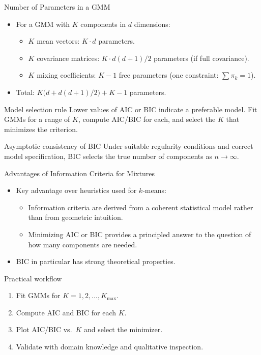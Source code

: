 \begin{frame}{Number of Parameters in a GMM}
  \begin{itemize}
    \item For a GMM with $K$ components in $d$ dimensions:
      \begin{itemize}
        \item $K$ mean vectors: $K \cdot d$ parameters.
        \item $K$ covariance matrices: $K \cdot d(d+1)/2$ parameters (if full covariance).
        \item $K$ mixing coefficients: $K-1$ free parameters (one constraint: $\sum\pi_k=1$).
      \end{itemize}
    \item Total: $K\big(d+d(d+1)/2\big)+K-1$ parameters.
  \end{itemize}
  \begin{block}{Model selection rule}
    Lower values of AIC or BIC indicate a preferable model. Fit GMMs for a range of $K$,
    compute AIC/BIC for each, and select the $K$ that minimizes the criterion.
  \end{block}
  \begin{alertblock}{Asymptotic consistency of BIC}
    Under suitable regularity conditions and correct model specification, BIC selects the
    true number of components as $n\to\infty$.
  \end{alertblock}
\end{frame}

\begin{frame}{Advantages of Information Criteria for Mixtures}
  \begin{itemize}
    \item Key advantage over heuristics used for $k$-means:
      \begin{itemize}
        \item Information criteria are \alert{derived} from a coherent statistical model
              rather than from geometric intuition.
        \item Minimizing AIC or BIC provides a principled answer to the question of how
              many components are needed.
      \end{itemize}
    \item BIC in particular has strong theoretical properties.
  \end{itemize}
  \begin{block}{Practical workflow}
    \begin{enumerate}
      \item Fit GMMs for $K=1,2,\ldots,K_{\max}$.
      \item Compute AIC and BIC for each $K$.
      \item Plot AIC/BIC vs.\ $K$ and select the minimizer.
      \item Validate with domain knowledge and qualitative inspection.
    \end{enumerate}
  \end{block}
\end{frame}

